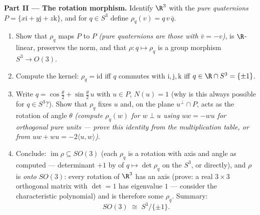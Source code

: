 \begin{problem}
\medskip
\noindent\textbf{Part II --- The rotation morphism.} Identify
$\R^3$ with the \emph{pure quaternions} $P = \{x\mathrm i +
y\mathrm j + z\mathrm k\}$, and for $q \in S^3$ define
$\rho_q(v) = q\,v\,\bar q$.
\begin{enumerate}[resume]
  \item Show that $\rho_q$ maps $P$ to $P$ \emph{(pure
        quaternions are those with $\bar v = -v$)}, is
        $\R$-linear, preserves the norm, and that $\rho
        \colon q \mapsto \rho_q$ is a group morphism $S^3
        \to O(3)$.
  \item Compute the kernel: $\rho_q = \mathrm{id}$ iff $q$
        commutes with $\mathrm i, \mathrm j, \mathrm k$ iff
        $q \in \R\cap S^3 = \{\pm1\}$.
  \item Write $q = \cos\frac\theta2 + \sin\frac\theta2\,u$
        with $u \in P$, $N(u) = 1$ (why is this always
        possible for $q \in S^3$?). Show that $\rho_q$ fixes
        $u$ and, on the plane $u^\perp\cap P$, acts as the
        rotation of angle $\theta$ \emph{(compute
        $\rho_q(w)$ for $w \perp u$ using $uw = -wu$ for
        orthogonal pure units --- prove this identity from
        the multiplication table, or from $uw + wu =
        -2\langle u, w\rangle$)}.
  \item Conclude: $\operatorname{im}\rho \subseteq SO(3)$
        (each $\rho_q$ is a rotation with axis and angle as
        computed --- determinant $+1$ by  of $q
        \mapsto \det\rho_q$ on the  $S^3$, or
        directly), and $\rho$ is \emph{onto} $SO(3)$: every
        rotation of $\R^3$ has an axis (prove: a real
        $3\times3$ orthogonal matrix with $\det = 1$ has
        eigenvalue $1$ --- consider the characteristic
        polynomial) and is therefore some $\rho_q$. Summary:
        \[
        SO(3) \;\cong\; S^3/\{\pm 1\} .
        \]
\end{enumerate}


\end{problem}
